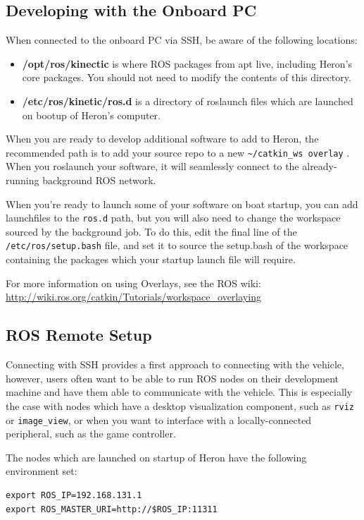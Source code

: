 \documentclass[]{clearpath-latex/clearpath-manual}
\begin{document}
\subsection{Developing with the Onboard PC}
When connected to the onboard PC via SSH, be aware of the following locations:

\begin{itemize}[nolistsep]
	\item \textbf{/opt/ros/kinectic} is where ROS packages from apt live, including Heron’s core packages. You should not need to modify the contents of this directory.
	\item \textbf{/etc/ros/kinetic/ros.d} is a directory of roslaunch files which are launched on bootup of Heron's computer.
\end{itemize}

When you are ready to develop additional software to add to Heron, the recommended path is to add your source repo to a new \lstinline{~/catkin_ws overlay} . When you roslaunch your software, it will seamlessly connect to the already-running background ROS network.

When you’re ready to launch some of your software on boat startup, you can add launchfiles to the \lstinline{ros.d} path, but you will also need to change the workspace sourced by the background job. To do this, edit the final line of the \lstinline{/etc/ros/setup.bash} file, and set it to source the setup.bash of the workspace containing the packages which your startup launch file will require.

For more information on using Overlays, see the ROS wiki: \url{http://wiki.ros.org/catkin/Tutorials/workspace_overlaying}

\subsection{ROS Remote Setup}
Connecting with SSH provides a first approach to connecting with the vehicle, however, users often want to be able to run ROS nodes on their development machine and have them able to communicate with the vehicle. This is especially the case with nodes which have a desktop visualization component, such as \lstinline{rviz} or \lstinline{image_view}, or when you want to interface with a locally-connected peripheral, such as the game controller.

The nodes which are launched on startup of Heron have the following environment set:

\begin{lstlisting}
export ROS_IP=192.168.131.1
export ROS_MASTER_URI=http://$ROS_IP:11311
\end{lstlisting}
\end{document}
